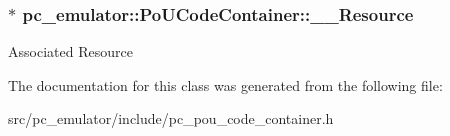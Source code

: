 \subsubsection[{\texorpdfstring{\+\_\+\+\_\+\+Resource}{__Resource}}]{$\ast$ pc\+\_\+emulator\+::\+Po\+U\+Code\+Container\+::\+\_\+\+\_\+\+Resource}\hypertarget{classpc__emulator_1_1PoUCodeContainer_a9770310f0434d5898949531307d6acbb}{}\label{classpc__emulator_1_1PoUCodeContainer_a9770310f0434d5898949531307d6acbb}
Associated Resource 

The documentation for this class was generated from the following file\+:\begin{DoxyCompactItemize}
\item 
src/pc\+\_\+emulator/include/pc\+\_\+pou\+\_\+code\+\_\+container.\+h\end{DoxyCompactItemize}
